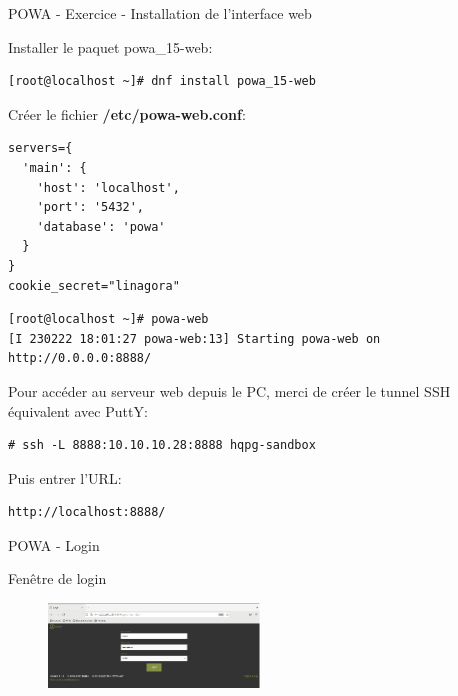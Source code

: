 
\begin{frame}[fragile]{POWA - Exercice - Installation de l'interface web}

   Installer le paquet powa\_15-web:
\begin{tiny}
\begin{Verbatim}[commandchars=\&\{\}]
[root@localhost ~]# dnf install powa_15-web
\end{Verbatim}
\end{tiny}

   Créer le fichier \textbf{/etc/powa-web.conf}:
\begin{tiny}
\begin{Verbatim}[commandchars=\&\#\#]
servers={
  'main': {
    'host': 'localhost',
    'port': '5432',
    'database': 'powa'
  }
}
cookie_secret="linagora"
\end{Verbatim}
\end{tiny}

\begin{tiny}
\begin{Verbatim}[commandchars=\&\{\}]
[root@localhost ~]# powa-web
[I 230222 18:01:27 powa-web:13] Starting powa-web on http://0.0.0.0:8888/
\end{Verbatim}
\end{tiny}

Pour accéder au serveur web depuis le PC, merci de créer le tunnel SSH équivalent avec PuttY:
\begin{tiny}
\begin{Verbatim}[commandchars=\\\{\}]
# ssh -L 8888:10.10.10.28:8888 hqpg-sandbox
\end{Verbatim}
\end{tiny}

Puis entrer l'URL:
\begin{tiny}
\begin{Verbatim}[commandchars=\\\{\}]
http://localhost:8888/
\end{Verbatim}
\end{tiny}

\end{frame}


\begin{frame}{POWA - Login}

   Fenêtre de login

\begin{figure}
\begin{center}
\includegraphics[angle=0, width=0.5\textwidth]{images/powa_login.eps}
\end{center}
\end{figure}

\end{frame}

